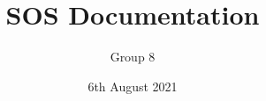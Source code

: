\documentclass[a4paper,12pt]{article}
\title{SOS Documentation}
\author{Group 8}
\date{6th August 2021}
\begin{document}
\begin{titlepage}
\maketitle
\end{titlepage}







\end{document}
